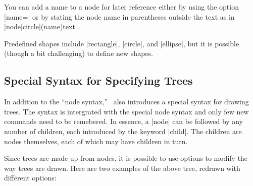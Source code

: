 You can add a name to a node for later reference either by using the
option   |name=| or by stating the node name in
parentheses outside the text as in |node[circle](name){text}|.

Predefined shapes include |rectangle|, |circle|, and |ellipse|, but
it is possible (though a bit challenging) to define new shapes.

\subsection{Special Syntax for Specifying Trees}

In addition to the ``node syntax,'' \tikzname\ also introduces a
special syntax for drawing trees. The syntax is intergrated with the
special node syntax and only few new commands need to be remebered.
In essence, a |node| can be followed by any number of children, each
introduced by the keyword |child|. The children are nodes themselves,
each of which may have children in turn.

\begin{codeexample}[]
\end{codeexample}

Since trees are made up from nodes, it is possible to use options to
modify the way trees are drawn. Here are two examples of the above tree,
redrawn with different options:

\begin{codeexample}[]
\end{codeexample}

\begin{codeexample}[]
\end{codeexample}

